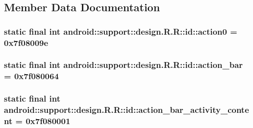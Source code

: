 \subsection{Member Data Documentation}
\hypertarget{classandroid_1_1support_1_1design_1_1_r_1_1id_1938dcbc082e7d1e0b58530c4945f99f}{
\subsubsection[{action0}]{\setlength{\rightskip}{0pt plus 5cm}static final int android::support::design.R.R::id::action0 = 0x7f08009e}}
\label{classandroid_1_1support_1_1design_1_1_r_1_1id_1938dcbc082e7d1e0b58530c4945f99f}


\hypertarget{classandroid_1_1support_1_1design_1_1_r_1_1id_64880d07a7243183697c19309c206f2b}{
\subsubsection[{action\_\-bar}]{\setlength{\rightskip}{0pt plus 5cm}static final int android::support::design.R.R::id::action\_\-bar = 0x7f080064}}
\label{classandroid_1_1support_1_1design_1_1_r_1_1id_64880d07a7243183697c19309c206f2b}


\hypertarget{classandroid_1_1support_1_1design_1_1_r_1_1id_ec99d76af19343009e9fabe0ca983ca4}{
\subsubsection[{action\_\-bar\_\-activity\_\-content}]{\setlength{\rightskip}{0pt plus 5cm}static final int android::support::design.R.R::id::action\_\-bar\_\-activity\_\-content = 0x7f080001}}
\label{classandroid_1_1support_1_1design_1_1_r_1_1id_ec99d76af19343009e9fabe0ca983ca4}


